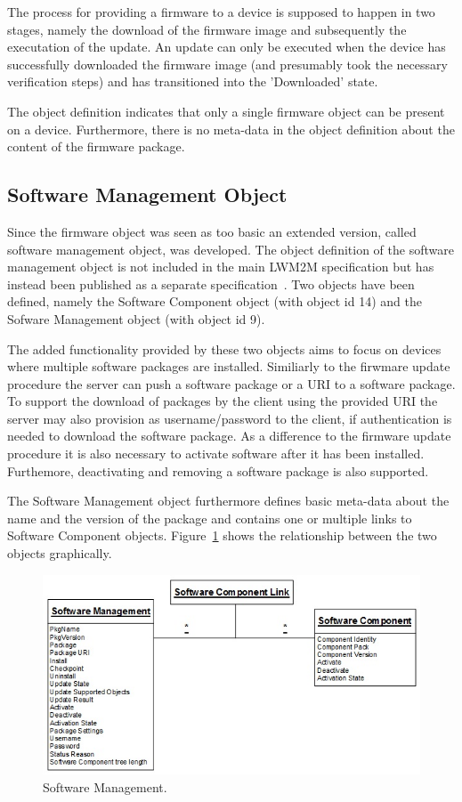 \documentclass[peerreview, a4paper, 7pt]{IEEEtran}
\begin{document}
The process for providing a firmware to a device is supposed to happen in two stages, namely the download of the firmware image and subsequently the executation of the update. An update can only be executed when the device has successfully downloaded the firmware image (and presumably took the necessary verification steps) and has transitioned into the 'Downloaded' state. 

The object definition indicates that only a single firmware object can be present on a device. Furthermore, there is no meta-data in the object definition about the content of the firmware package. 

\subsection{Software Management Object}
Since the firmware object was seen as too basic an extended version, called software management object, was developed. The object definition of the software management object is not included in the main LWM2M specification but has instead been published as a separate specification~\cite{SwMgmt}. Two objects have been defined, namely the Software Component object (with object id 14) and the Sofware Management object (with object id 9). 

The added functionality provided by these two objects aims to focus on devices where multiple software packages are installed. Similiarly to the firwmare update procedure the server can push a software package or a URI to a software package. To support the download of packages by the client using the provided URI the server may also provision as username/password to the client, if authentication is needed to download the software package. As a difference to the firmware update procedure it is also necessary to activate software after it has been installed. Furthemore, deactivating and removing a software package is also supported. 

The Software Management object furthermore defines basic meta-data about the name and the version of the package and contains one or multiple links to Software Component objects. Figure~\ref{software-management-figure} shows the relationship between the two objects graphically. 

\begin{figure}[!htbp]
 \centering
 \includegraphics[scale=0.50]{software-management.jpg}
 \caption{Software Management.}
 \label{software-management-figure}
\end{figure}
\end{document}
